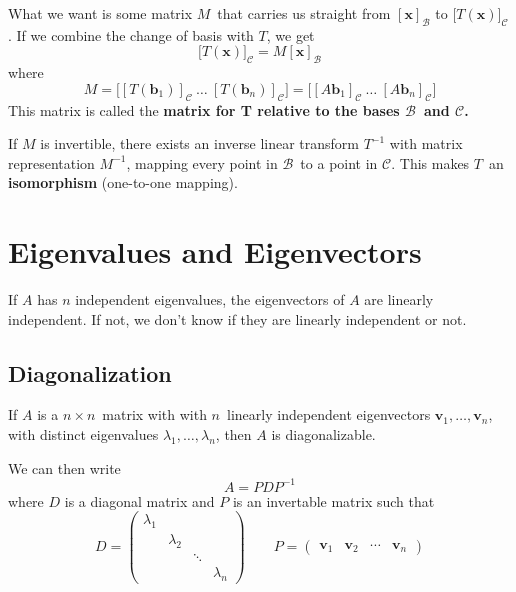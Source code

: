 \documentclass[12p,a4paper]{report}
\renewcommand{\b}{\boldsymbol}
\begin{document}
What we want is some matrix $M$ that carries us straight from $[\b x]_\mathcal{B}$ to $\big[T(\b x)\big]_\mathcal{C}$. If we combine the change of basis with $T$, we get
\[
    \big[T(\b x)\big]_\mathcal{C} = M[\b x]_\mathcal{B}
\]
where
\[
    M = \Big[[T(\b b_1)]_\mathcal{C}\ \dots \ [T(\b b_n)]_\mathcal{C} \Big]
      = \Big[[A\b b_1]_\mathcal{C}\ \dots \ [A\b b_n]_\mathcal{C} \Big]
\]
This matrix is called the \textbf{matrix for T relative to the bases $\mathcal{B}$ and $\mathcal{C}$.}

If $M$ is invertible, there exists an inverse linear transform $T^{-1}$ with matrix representation $M^{-1}$, mapping every point in $\mathcal{B}$ to a point in $\mathcal{C}$. This makes $T$ an \textbf{isomorphism} (one-to-one mapping).





\chapter{Eigenvalues and Eigenvectors}

If $A$ has $n$ independent eigenvalues, the eigenvectors of $A$ are linearly independent. If not, we don't know if they are linearly independent or not.


\section{Diagonalization}
If $A$ is a $n\times n$ matrix with with $n$ linearly independent eigenvectors $\b v_1, \dots, \b v_n$, with distinct eigenvalues $\lambda_1,\dots,\lambda_n$, then $A$ is diagonalizable.

We can then write
\[
    A = P D P^{-1}
\]
where $D$ is a diagonal matrix and $P$ is an invertable matrix such that
\[
    D = \begin{pmatrix} \lambda_1 &           &         & \\
                                  & \lambda_2 &         & \\
                                  &           & \ddots  & \\
                                  &           &         & \lambda_n
        \end{pmatrix}
        \quad\quad
    P = \begin{pmatrix} \b v_1 & \b v_2 & \cdots & \b v_n \end{pmatrix}
\]
\end{document}
